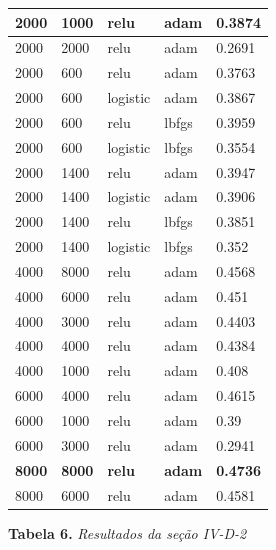 \documentclass[conference]{IEEEtran}
\begin{document}
\begin{center}
\begin{tabular}{| l | l | l | l | l |}
2000 & 1000 & relu     & adam  & 0.3874  \\ \hline
2000 & 2000 & relu     & adam  & 0.2691 \\ \hline
2000 & 600  & relu     & adam  & 0.3763  \\ \hline
2000 & 600  & logistic & adam  & 0.3867  \\ \hline
2000 & 600  & relu     & lbfgs & 0.3959  \\ \hline
2000 & 600  & logistic & lbfgs & 0.3554  \\ \hline
2000 & 1400 & relu     & adam  & 0.3947  \\ \hline
2000 & 1400 & logistic & adam  & 0.3906  \\ \hline
2000 & 1400 & relu     & lbfgs & 0.3851  \\ \hline
2000 & 1400 & logistic & lbfgs & 0.352     \\ \hline
4000 & 8000 & relu     & adam  & 0.4568  \\ \hline
4000 & 6000 & relu     & adam  & 0.451  \\ \hline
4000 & 3000 & relu     & adam  & 0.4403  \\ \hline
4000 & 4000 & relu     & adam  & 0.4384  \\ \hline
4000 & 1000 & relu     & adam  & 0.408   \\ \hline
6000 & 4000 & relu     & adam  & 0.4615  \\ \hline
6000 & 1000 & relu     & adam  & 0.39    \\ \hline
6000 & 3000 & relu     & adam  & 0.2941  \\ \hline
\textbf{8000} & \textbf{8000} & \textbf{relu}     & \textbf{adam}  & \textbf{0.4736}  \\ \hline
8000 & 6000 & relu     & adam  & 0.4581  \\ \hline
\end{tabular}
\newline
\newline
\textbf{Tabela 6.} \textit{Resultados da seção IV-D-2}

\end{center}
\end{document}
